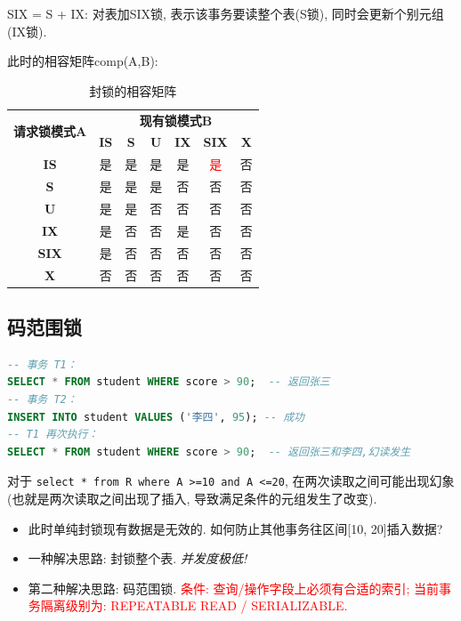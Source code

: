 SIX = S + IX: 对表加SIX锁, 表示该事务要读整个表(S锁), 同时会更新个别元组(IX锁).

此时的相容矩阵comp(A,B):
\begin{table}[H]
    \centering
    \begin{tabular}{|c|c|c|c|c|c|c|}
        \hline
        \multirow{2}{*}{\textbf{请求锁模式A}} & \multicolumn{6}{c|}{\textbf{现有锁模式B}} \\ \cline{2-7}
         & \textbf{IS} & \textbf{S} & \textbf{U} & \textbf{IX} & \textbf{SIX} & \textbf{X} \\ \hline
        \textbf{IS}  & 是 & 是 & 是 & 是 & \textcolor{red}{是} & 否 \\ \hline
        \textbf{S}   & 是 & 是 & 是 & 否 & 否 & 否 \\ \hline
        \textbf{U}   & 是 & 是 & 否 & 否 & 否 & 否 \\ \hline
        \textbf{IX}  & 是 & 否 & 否 & 是 & 否 & 否 \\ \hline
        \textbf{SIX} & 是 & 否 & 否 & 否 & 否 & 否 \\ \hline
        \textbf{X}   & 否 & 否 & 否 & 否 & 否 & 否 \\ \hline
    \end{tabular}
    \caption{封锁的相容矩阵}
\end{table}

\subsection{码范围锁}

\begin{lstlisting}[language=SQL, caption={幻象例子}]
-- 事务 T1：
SELECT * FROM student WHERE score > 90;  -- 返回张三
-- 事务 T2：
INSERT INTO student VALUES ('李四', 95); -- 成功
-- T1 再次执行：
SELECT * FROM student WHERE score > 90;  -- 返回张三和李四,幻读发生
\end{lstlisting}

对于 \verb|select * from R where A >=10 and A <=20|, 在两次读取之间可能出现幻象(也就是两次读取之间出现了插入, 导致满足条件的元组发生了改变).
\begin{itemize}
  \item 此时单纯封锁现有数据是无效的. 如何防止其他事务往区间[10, 20]插入数据?
  \item 一种解决思路: 封锁整个表. \textit{并发度极低!}
  \item 第二种解决思路: 码范围锁. \textcolor{red}{条件: 查询/操作字段上必须有合适的索引; 当前事务隔离级别为: REPEATABLE READ / SERIALIZABLE.}
\end{itemize}

